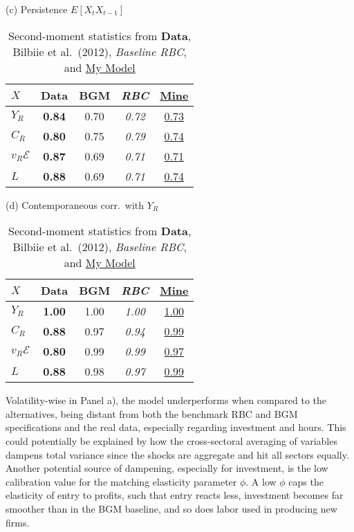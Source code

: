 \documentclass[a4paper,12pt]{article} %
\numberwithin{equation}{section} %
\numberwithin{figure}{section}
\numberwithin{table}{section}
\newcommand{\dat}{\textbf}      %
\newcommand{\rbc}{\emph}        %
\newcommand{\mine}[1]{\underline{#1}}   %
\begin{document}
\begin{table}[H]
\begin{subtable}[t]{.48\textwidth}
  \centering
  \caption*{(c) Persistence $E[X_t X_{t-1}]$}
  \begin{tabular}{lcccc}
  \toprule
   $X$ & \dat{Data} & BGM & \rbc{RBC} & \mine{Mine}\\
  \midrule
   $Y_R$      & \dat{0.84} & 0.70 & \rbc{0.72} & \mine{0.73}\\
   $C_R$      & \dat{0.80} & 0.75 & \rbc{0.79} & \mine{0.74}\\
   $v_R\mathcal{E}$   & \dat{0.87} & 0.69 & \rbc{0.71} & \mine{0.71}\\
   $L$        & \dat{0.88} & 0.69 & \rbc{0.71} & \mine{0.74}\\
  \bottomrule
  \end{tabular}
\end{subtable}
\hfill
\begin{subtable}[t]{.48\textwidth}
  \centering
  \caption*{(d) Contemporaneous corr.\ with $Y_R$}
  \begin{tabular}{lcccc}
  \toprule
   $X$ & \dat{Data} & BGM & \rbc{RBC} & \mine{Mine}\\
  \midrule
   $Y_R$      & \dat{1.00} & 1.00 & \rbc{1.00} & \mine{1.00}\\
   $C_R$      & \dat{0.88} & 0.97 & \rbc{0.94} & \mine{0.99}\\
   $v_R\mathcal{E}$   & \dat{0.80} & 0.99 & \rbc{0.99} & \mine{0.97}\\
   $L$        & \dat{0.88} & 0.98 & \rbc{0.97} & \mine{0.99}\\
  \bottomrule
  \end{tabular}
\end{subtable}
\caption{Second-moment statistics from \dat{Data}, Bilbiie et al.\ (2012), 
\rbc{Baseline RBC}, and \mine{My Model}}
\label{tab:moments}
\end{table}

Volatility-wise in Panel a), the model underperforms when compared to the alternatives, being distant from both the
benchmark RBC and BGM specifications and the real data, especially regarding investment and hours. This could potentially
be explained by how the cross-sectoral averaging of variables dampens total variance since the shocks are aggregate and hit
all sectors equally. Another potential source of dampening, especially for investment, is the low calibration value
for the matching elasticity parameter $\phi$. A low $\phi$ caps the elasticity of entry to profits, such that entry
reacts less, investment becomes far smoother than in the BGM baseline, and so does labor used in producing new firms. 
\end{document}

